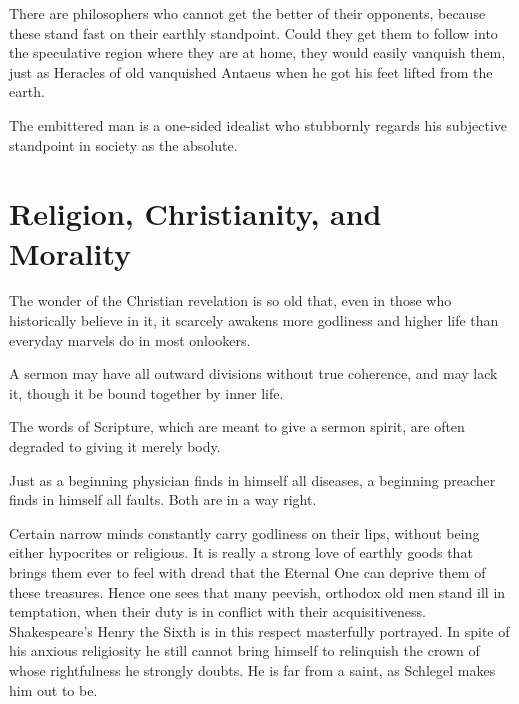 \documentclass[12pt,a4paper]{article}
\newcommand{\opage}[1]{\marginnote{\footnotesize\textit{[#1]}}}
\newcommand{\aphsep}{\par\smallskip\centerline{\textasteriskcentered}\smallskip}
\begin{document}
\aphsep

There are philosophers who cannot get the better of their opponents, because
these stand fast on their earthly standpoint. Could they get them to follow into
the speculative region where they are at home, they would easily vanquish them,
just as Heracles of old vanquished Antaeus when he got his feet lifted from the
earth.

\aphsep

The embittered man is a one-sided idealist who stubbornly regards his subjective
standpoint in society as the absolute.

\bigskip

\section*{Religion, Christianity, and Morality}
\label{ch:005}

The wonder of the Christian revelation is so old that, even in those who
historically believe in it, it scarcely awakens more godliness and higher life
than everyday marvels do in most onlookers.

\aphsep

A sermon may have all outward divisions without true coherence, and may lack it,
though it be bound together by inner life.

\aphsep

The words of Scripture, which are meant to give a sermon spirit, are often
degraded to giving it merely body.

\aphsep

Just as a beginning physician finds in himself all diseases, a beginning preacher
finds in himself all faults. Both are in a way right.

\aphsep

Certain narrow minds constantly carry godliness on their lips, without being
either hypocrites or religious. It is really a strong love of earthly goods that
brings them ever to feel with dread that the Eternal One can deprive them of
these treasures. Hence one sees that many peevish, orthodox old men stand ill in
temptation, when their duty \opage{33}is in conflict with their acquisitiveness.
Shakespeare's Henry the Sixth is in this respect masterfully portrayed. In spite
of his anxious religiosity he still cannot bring himself to relinquish the crown
of whose rightfulness he strongly doubts. He is far from a saint, as Schlegel
makes him out to be.
\end{document}
